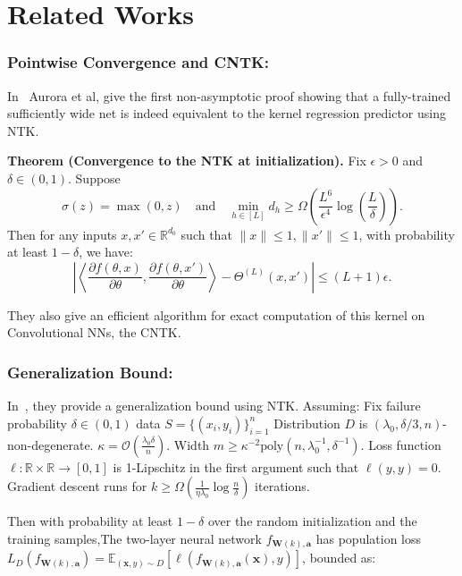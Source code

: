 \section{Related Works}
\subsubsection{Pointwise Convergence and CNTK:}
In~\cite{lee2018exact} Aurora et al, give the first non-asymptotic proof showing that a fully-trained sufficiently wide net is indeed equivalent to the kernel regression predictor using NTK.


\textbf{Theorem (Convergence to the NTK at initialization).} Fix $\epsilon > 0$ and $\delta \in (0,1)$. Suppose 
\[
\sigma(z) = \max(0, z) \quad \text{and} \quad \min_{h \in [L]} d_h \geq \Omega\left(\frac{L^6}{\epsilon^4} \log\left(\frac{L}{\delta}\right)\right).
\]
Then for any inputs $x, x' \in \mathbb{R}^{d_0}$ such that $\|x\| \leq 1, \|x'\| \leq 1$, with probability at least $1 - \delta$, we have:
\[
\left| \left\langle \frac{\partial f(\theta, x)}{\partial \theta}, \frac{\partial f(\theta, x')}{\partial \theta} \right\rangle - \Theta^{(L)}(x, x') \right| \leq (L + 1)\epsilon.
\]

They also give an efficient algorithm for exact computation of this kernel on Convolutional NNs, the CNTK.

\subsubsection{Generalization Bound:}
In~\cite{cao2019fine}, they provide a generalization bound using NTK. Assuming:
		 Fix failure probability \(\delta \in (0,1)\)
		 data \(S = \{(x_i,y_i)\}_{i=1}^n\)
		 Distribution \( D \) is \( (\lambda_0, \delta/3, n) \)-non-degenerate.
		 \( \kappa = \mathcal{O}\left( \frac{\lambda_0 \delta}{n} \right) \).
		 Width \( m \geq \kappa^{-2} \text{poly}(n, \lambda_0^{-1}, \delta^{-1}) \).
		 Loss function \( \ell: \mathbb{R} \times \mathbb{R} \to [0, 1] \) is 1-Lipschitz in the first
		argument such that \( \ell(y, y) = 0 \).
		 Gradient descent runs for \( k \geq \Omega\left( \frac{1}{\eta \lambda_0} \log \frac{n}{\delta} \right) \) iterations.
	

 Then with probability at least  \(1-\delta\) over the random initialization and the training
		samples,The two-layer neural network \(f_{\mathbf{W}(k), \mathbf{a}}\) has population loss \( L_D(f_{\mathbf{W}(k), \mathbf{a}}) = \mathbb{E}_{(\mathbf{x},y)\sim D}[\ell(f_{\mathbf{W}(k), \mathbf{a}}(\mathbf{x}),y)] \), bounded as: 
		
